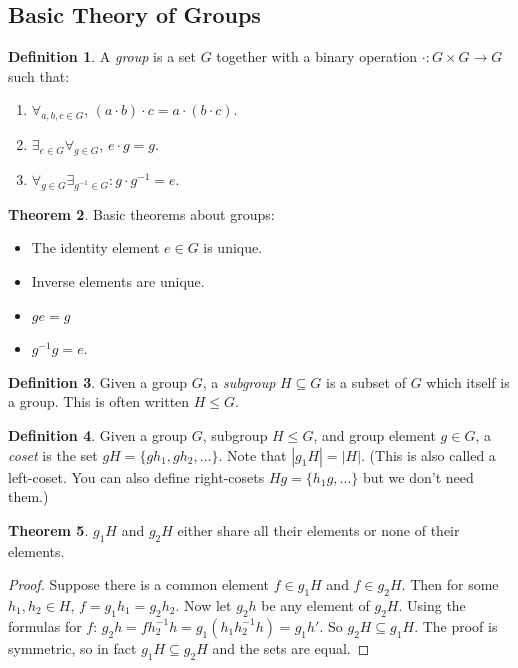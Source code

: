 \documentclass[12pt, letterpaper]{article}
\theoremstyle{definition} %
\newtheorem{thm}{Theorem}[section] %
\newtheorem{defn}[thm]{Definition} %
\begin{document}
\subsection{Basic Theory of Groups}
\begin{defn}
  A \emph{group} is a set $G$ together with a binary operation $\cdot:G\times G\to G$ such that:
  \begin{enumerate}
    \item $\forall_{a,b,c\in G}$, $(a\cdot b)\cdot c=a\cdot (b\cdot c)$.
    \item $\exists_{e\in G} \forall_{g\in G}$,  $e\cdot g=g$.
    \item $\forall_{g\in G} \exists_{g^{-1}\in G}: g\cdot g^{-1}=e$.
  \end{enumerate}
\end{defn}
\begin{thm} Basic theorems about groups:
  \begin{itemize}
    \item The identity element $e\in G$ is unique.
    \item Inverse elements are unique.
    \item $ge=g$
    \item $g^{-1} g=e$.
  \end{itemize}
\end{thm}
\begin{defn}
  Given a group $G$, a \emph{subgroup} $H\subseteq G$ is a subset of $G$ which itself is a group. 
  This is often written $H\leq G$.
\end{defn}
\begin{defn}
  Given a group $G$, subgroup $H\leq G$, and group element $g\in G$, a \emph{coset} is the set
  $gH=\{g h_1,g h_2,\ldots\}$. Note that $|g_1 H|=|H|$. (This is also called a 
    left-coset. You can also define right-cosets $Hg=\{h_1 g,\ldots\}$ but we don't 
  need them.)
\end{defn}
\begin{thm}
  $g_1 H$ and $g_2 H$ either share all their elements or none of their elements.
\end{thm}
\begin{proof}
  Suppose there is a common element $f\in g_1 H$ and $f\in g_2 H$. Then for some $h_1, h_2\in H$, $f=g_1 h_1=g_2 h_2$.
  Now let $g_2 h$ be any element of $g_2 H$. Using the formulas for $f$: 
  $g_2 h=f h_2^{-1} h=g_1\left( h_1 h_2^{-1} h\right)=g_1 h'$. So $g_2 H\subseteq g_1H$. The proof is symmetric, so in fact
  $g_1 H\subseteq g_2 H$ and the sets are equal.
\end{proof}
\end{document}
